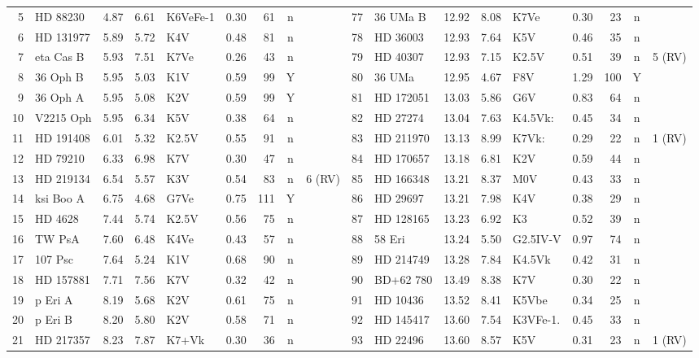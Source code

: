 \begin{landscape}
\begin{longtable}{r l r r l r r c l @{\;\vrule\;} r l r r l r r c l}
5 & HD 88230 & 4.87 & 6.61 & K6VeFe-1 & 0.30 & 61 & n &  & 77 & 36 UMa B & 12.92 & 8.08 & K7Ve & 0.30 & 23 & n &  \\
6 & HD 131977 & 5.89 & 5.72 & K4V & 0.48 & 81 & n &  & 78 & HD 36003 & 12.93 & 7.64 & K5V & 0.46 & 35 & n &  \\
7 & eta Cas B & 5.93 & 7.51 & K7Ve & 0.26 & 43 & n &  & 79 & HD 40307 & 12.93 & 7.15 & K2.5V & 0.51 & 39 & n & 5 (RV) \\
8 & 36 Oph B & 5.95 & 5.03 & K1V & 0.59 & 99 & Y &  & 80 & 36 UMa & 12.95 & 4.67 & F8V & 1.29 & 100 & Y &  \\
9 & 36 Oph A & 5.95 & 5.08 & K2V & 0.59 & 99 & Y &  & 81 & HD 172051 & 13.03 & 5.86 & G6V & 0.83 & 64 & n &  \\
10 & V2215 Oph & 5.95 & 6.34 & K5V & 0.38 & 64 & n &  & 82 & HD 27274 & 13.04 & 7.63 & K4.5Vk: & 0.45 & 34 & n &  \\
11 & HD 191408 & 6.01 & 5.32 & K2.5V & 0.55 & 91 & n &  & 83 & HD 211970 & 13.13 & 8.99 & K7Vk: & 0.29 & 22 & n & 1 (RV) \\
12 & HD 79210 & 6.33 & 6.98 & K7V & 0.30 & 47 & n &  & 84 & HD 170657 & 13.18 & 6.81 & K2V & 0.59 & 44 & n &  \\
13 & HD 219134 & 6.54 & 5.57 & K3V & 0.54 & 83 & n & 6 (RV) & 85 & HD 166348 & 13.21 & 8.37 & M0V & 0.43 & 33 & n &  \\
14 & ksi Boo A & 6.75 & 4.68 & G7Ve & 0.75 & 111 & Y &  & 86 & HD 29697 & 13.21 & 7.98 & K4V & 0.38 & 29 & n &  \\
15 & HD 4628 & 7.44 & 5.74 & K2.5V & 0.56 & 75 & n &  & 87 & HD 128165 & 13.23 & 6.92 & K3 & 0.52 & 39 & n &  \\
16 & TW PsA & 7.60 & 6.48 & K4Ve & 0.43 & 57 & n &  & 88 & 58 Eri & 13.24 & 5.50 & G2.5IV-V & 0.97 & 74 & n &  \\
17 & 107 Psc & 7.64 & 5.24 & K1V & 0.68 & 90 & n &  & 89 & HD 214749 & 13.28 & 7.84 & K4.5Vk & 0.42 & 31 & n &  \\
18 & HD 157881 & 7.71 & 7.56 & K7V & 0.32 & 42 & n &  & 90 & BD+62 780 & 13.49 & 8.38 & K7V & 0.30 & 22 & n &  \\
19 & p Eri A & 8.19 & 5.68 & K2V & 0.61 & 75 & n &  & 91 & HD 10436 & 13.52 & 8.41 & K5Vbe & 0.34 & 25 & n &  \\
20 & p Eri B & 8.20 & 5.80 & K2V & 0.58 & 71 & n &  & 92 & HD 145417 & 13.60 & 7.54 & K3VFe-1. & 0.45 & 33 & n &  \\
21 & HD 217357 & 8.23 & 7.87 & K7+Vk & 0.30 & 36 & n &  & 93 & HD 22496 & 13.60 & 8.57 & K5V & 0.31 & 23 & n & 1 (RV) \\

\end{longtable}
\end{landscape}
